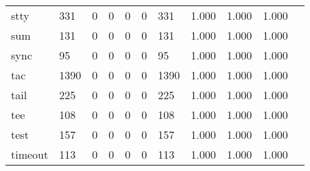 \begin{longtable}{lp{1.10cm}p{1.10cm}p{1.10cm}p{1.10cm}p{1.10cm}p{1.10cm}p{1.10cm}p{1.10cm}p{1.10cm}p{1.10cm}}
stty      &                    331 &                                  0 &                                 0 &                                0 &                                 0 &                             331 &                          1.000 &                                 1.000 &                               1.000 \\
sum       &                    131 &                                  0 &                                 0 &                                0 &                                 0 &                             131 &                          1.000 &                                 1.000 &                               1.000 \\
sync      &                     95 &                                  0 &                                 0 &                                0 &                                 0 &                              95 &                          1.000 &                                 1.000 &                               1.000 \\
tac       &                   1390 &                                  0 &                                 0 &                                0 &                                 0 &                            1390 &                          1.000 &                                 1.000 &                               1.000 \\
tail      &                    225 &                                  0 &                                 0 &                                0 &                                 0 &                             225 &                          1.000 &                                 1.000 &                               1.000 \\
tee       &                    108 &                                  0 &                                 0 &                                0 &                                 0 &                             108 &                          1.000 &                                 1.000 &                               1.000 \\
test      &                    157 &                                  0 &                                 0 &                                0 &                                 0 &                             157 &                          1.000 &                                 1.000 &                               1.000 \\
timeout   &                    113 &                                  0 &                                 0 &                                0 &                                 0 &                             113 &                          1.000 &                                 1.000 &                               1.000 \\

\end{longtable}
